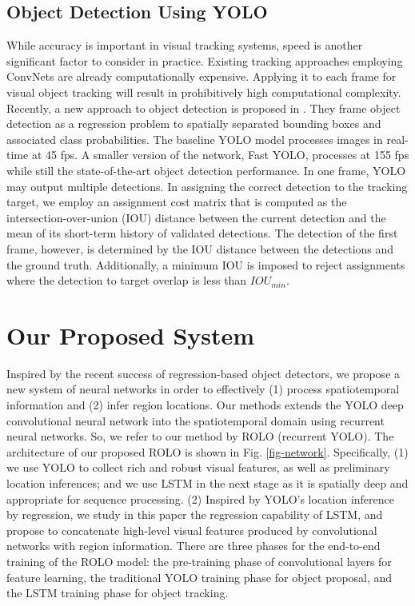 \documentclass{article}
\begin{document}
\subsection{Object Detection Using YOLO}

While accuracy is important in visual tracking systems, speed is another significant factor to consider in practice. Existing tracking approaches employing ConvNets are already computationally expensive. Applying it to each frame for visual object tracking will 
result in prohibitively high computational complexity. 
Recently, a new approach to object detection is proposed in \citep{redmon2015you}. They frame object detection as a regression problem to spatially separated bounding boxes and associated class probabilities. The baseline YOLO model processes images in real-time at 45 fps. A smaller version of the network, Fast YOLO, processes at 155 fps while still the state-of-the-art object detection performance.
In one frame, YOLO may output multiple detections. In assigning the correct detection to the tracking target, we employ an assignment cost matrix that is computed as the intersection-over-union (IOU) distance between the current detection and the mean of its short-term history of validated detections. The detection of the first frame, however, is determined by the IOU distance between the detections and the ground truth. Additionally, a minimum IOU is imposed to reject assignments where the detection to target overlap is less than $IOU_{min}$.

\section{Our Proposed System} \label{proposed-system}


Inspired by the recent success of regression-based object detectors, we propose a new system of neural networks in order to effectively (1) process spatiotemporal information and (2) infer region locations. 
Our methods extends the YOLO deep convolutional neural network into the spatiotemporal domain using recurrent neural networks. 
So, we refer to our method by ROLO (recurrent YOLO).
The architecture of our proposed  ROLO is shown in Fig. \ref{fig-network}. Specifically, 
(1) we use YOLO to collect rich and robust visual features, as well as preliminary location inferences; and we use LSTM in the next stage as it is spatially deep and appropriate for sequence processing. 
(2) Inspired by YOLO’s location inference by regression, we study in this paper the regression capability of LSTM, and propose to concatenate high-level visual features produced by convolutional networks with region information. 
There are three phases for the end-to-end training of the ROLO model: the pre-training phase of convolutional layers for feature learning, the traditional YOLO training phase for object proposal, and the LSTM training phase for object tracking. 
\end{document}
